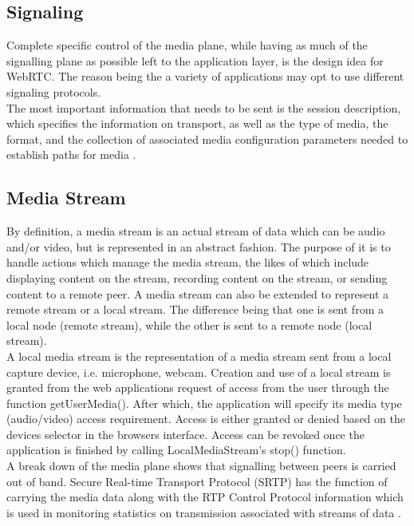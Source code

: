 \subsection{Signaling}
\label{signallingTechR}
Complete specific control of the media plane, while having as much of the signalling plane as possible left to the application layer, is the design idea for WebRTC. The reason being the a variety of applications may opt to use different signaling protocols.
\\ The most important information that needs to be sent is the session description, which specifies the information on transport, as well as the type of media, the format, and the collection of associated media configuration parameters needed to establish paths for media \cite{loreto2014real}.

\subsection{Media Stream}
By definition, a media stream is an actual stream of data which can be audio and/or video, but is represented in an abstract fashion. The purpose of it is to handle actions which manage the media stream, the likes of which include displaying content on the stream, recording content on the stream, or sending content to a remote peer. A media stream can also be extended to represent a remote stream or a local stream. The difference being that one is sent from a local node (remote stream), while the other is sent to a remote node (local stream).
\\ A local media stream is the representation of a media stream sent from a local capture device, i.e. microphone, webcam. Creation and use of a local stream is granted from the web applications request of access from the user through the function getUserMedia(). After which, the application will specify its media type (audio/video) access requirement. Access is either granted or denied based on the devices selector in the browsers interface. Access can be revoked once the application is finished by calling LocalMediaStream’s stop() function.
\\  A break down of the media plane shows that signalling between peers is carried out of band. Secure Real-time Transport Protocol (SRTP) has the function of carrying the media data along with the RTP Control Protocol information which is used in monitoring statistics on transmission associated with streams of data \cite{loreto2014real}.

